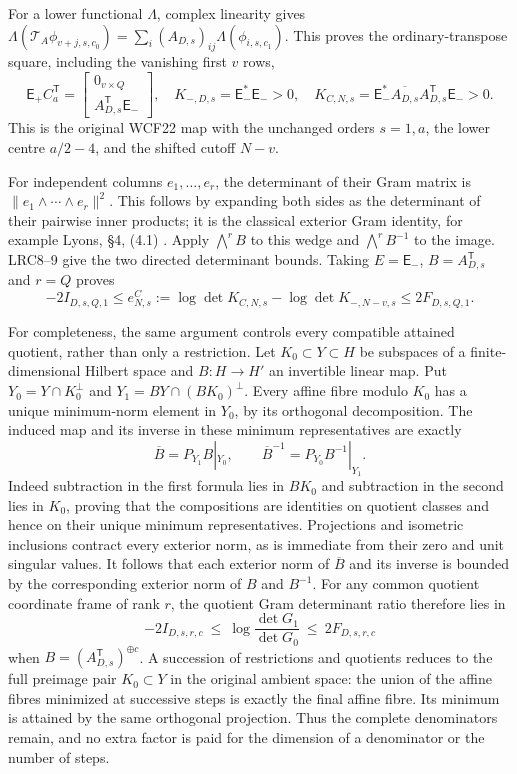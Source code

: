 \documentclass[11pt,a4paper]{article}
\begin{document}
For a lower functional $\Lambda$, complex linearity gives
$\Lambda(\mathcal T_A\phi_{v+j,s,c_0})
=\sum_i(A_{D,s})_{ij}\Lambda(\phi_{i,s,c_1})$.
This proves the ordinary-transpose square, including the vanishing
first $v$ rows,
\[
 \mathsf E_+C_a^{\mathsf T}
 =\begin{bmatrix}0_{v\times Q}\\A_{D,s}^{\mathsf T}\mathsf E_-\end{bmatrix},
 \quad K_{-,D,s}=\mathsf E_-^*\mathsf E_->0,\quad
 K_{C,N,s}=\mathsf E_-^*\overline{A_{D,s}}A_{D,s}^{\mathsf T}\mathsf E_->0.
                                                               \tag{LT25}
\]
This is the original WCF22 map with the unchanged orders $s=1,a$,
the lower centre $a/2-4$, and the shifted cutoff $N-v$.

For independent columns $e_1,\ldots,e_r$, the determinant of their
Gram matrix is $\|e_1\wedge\cdots\wedge e_r\|^2$. This follows
by expanding both sides as the determinant of their pairwise inner
products; it is the classical exterior Gram identity, for example
Lyons, \S4, (4.1) \cite{human:lyons2003}.
Apply $\bigwedge^r B$ to this wedge and $\bigwedge^r B^{-1}$
to the image. LRC8--9 give the two directed determinant bounds.
Taking $E=\mathsf E_-$, $B=A_{D,s}^{\mathsf T}$ and $r=Q$ proves
\[
 \boxed{-2I_{D,s,Q,1}\le e^C_{N,s}
 :=\log\det K_{C,N,s}-\log\det K_{-,N-v,s}
 \le2F_{D,s,Q,1}.}                                      \tag{LRC10}
\]

For completeness, the same argument controls every compatible attained
quotient, rather than only a restriction. Let $K_0\subset Y\subset H$
be subspaces of a finite-dimensional Hilbert space and $B:H\to H'$
an invertible linear map. Put
$Y_0=Y\cap K_0^\perp$ and $Y_1=BY\cap(BK_0)^\perp$.
Every affine fibre modulo $K_0$ has a unique minimum-norm element in
$Y_0$, by its orthogonal decomposition. The induced map and its inverse
in these minimum representatives are exactly
\[
 \overline B=P_{Y_1}B|_{Y_0},\qquad
 \overline B^{-1}=P_{Y_0}B^{-1}|_{Y_1}.                  \tag{LT26}
\]
Indeed subtraction in the first formula lies in $BK_0$ and subtraction
in the second lies in $K_0$, proving that the compositions are identities
on quotient classes and hence on their unique minimum representatives.
Projections and isometric inclusions contract every exterior norm,
as is immediate from their zero and unit singular values.
It follows that each exterior norm of $\overline B$ and its inverse
is bounded by the corresponding exterior norm of $B$ and $B^{-1}$.
For any common quotient coordinate frame of rank $r$, the quotient
Gram determinant ratio therefore lies in
\[
 -2I_{D,s,r,c}\ \le\ \log\frac{\det G_1}{\det G_0}
                    \ \le\ 2F_{D,s,r,c}                 \tag{LT27}
\]
when $B=(A_{D,s}^{\mathsf T})^{\oplus c}$.
A succession of restrictions and quotients reduces to the full
preimage pair $K_0\subset Y$ in the original ambient space: the
union of the affine fibres minimized at successive steps is exactly
the final affine fibre. Its minimum is attained by the same orthogonal
projection. Thus the complete denominators remain, and no extra factor
is paid for the dimension of a denominator or the number of steps.
\end{document}
